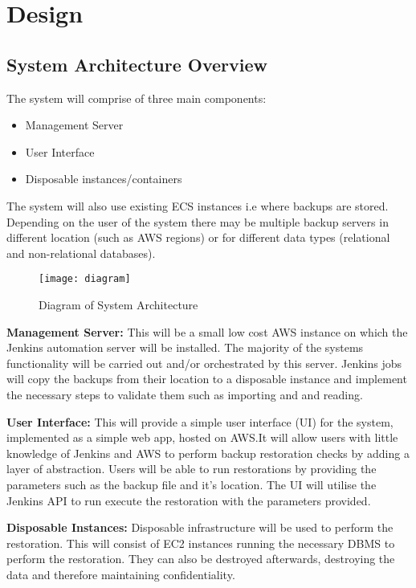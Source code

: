 
\section{Design}
	\subsection{System Architecture Overview}
		The system will comprise of three main components:
		\begin{itemize}
			\item Management Server
			\item User Interface
			\item Disposable instances/containers
		\end{itemize}
		The system will also use existing ECS instances i.e  where backups are stored. Depending on the user of the system there may be multiple backup servers in different location (such as AWS regions) or for different data types (relational and non-relational databases).
		
		\begin{figure}[H]
			\setlength{\belowcaptionskip}{15pt plus 3pt minus 2pt}
			\caption{Diagram of System Architecture}
			\centering
			\texttt{[image: diagram]}
			\label{fig:diagram}
		\end{figure}
		
		\noindent \textbf{Management Server:} This will be a small low cost AWS instance on which the Jenkins automation server will be installed. The majority of the systems functionality will be carried out and/or orchestrated by this server. Jenkins jobs will copy the backups from their location to a disposable instance and implement the necessary steps to validate them such as importing and and reading.
		
		\noindent \textbf{User Interface:} This will provide a simple user interface (UI) for the system, implemented as a simple web app, hosted on AWS.It will allow users with little knowledge of Jenkins and AWS to perform backup restoration checks by adding a layer of abstraction. Users will be able to run restorations by providing the parameters such as the backup file and it's location. The UI will utilise the Jenkins API to run execute the restoration with the parameters provided.
		
		\noindent\textbf{Disposable Instances:} Disposable infrastructure will be used to perform the restoration. This will consist of EC2 instances running the necessary DBMS to perform the restoration. They can also be destroyed afterwards, destroying the data and therefore maintaining confidentiality.

